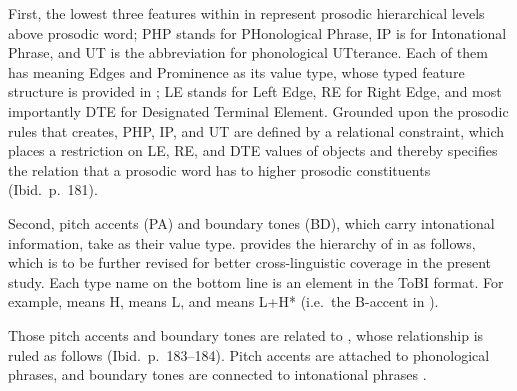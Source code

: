 First, the lowest three features within  in
 represent prosodic hierarchical
levels above prosodic word; PHP stands for PHonological Phrase, IP is
for Intonational Phrase, and UT is the abbreviation for phonological
UTterance. Each of them has  meaning Edges and Prominence as
its value type, whose typed feature structure is provided in
; LE stands for Left Edge, RE for Right Edge,
and most importantly DTE for Designated Terminal Element. Grounded
upon the prosodic rules that \citet{bildhauer:07} creates, PHP, IP,
and UT are defined by a relational constraint, which places a
restriction on LE, RE, and DTE values of  objects and
thereby specifies the relation that a prosodic word has to higher
prosodic constituents (Ibid.\ p.\ 181).





Second, pitch accents (PA) and boundary tones (BD), which carry
intonational information, take  as their value
type. \citet[p.\ 183]{bildhauer:07} provides the hierarchy of
 in  as follows, which is to be further
revised for better cross-linguistic coverage in the present study.
Each type name on the bottom line is an element in the ToBI
format. For example,  means H,  means L, and
 means L+H* (i.e.\ the B-accent in 
\citep{bolinger:61,jackendoff:72}).




\noindent Those pitch accents and boundary tones are related to
, whose relationship is ruled as follows
(Ibid.\ p.\ 183--184).  Pitch accents are attached to phonological
phrases, and boundary tones are connected to intonational phrases
\citep{steedman:00}.


